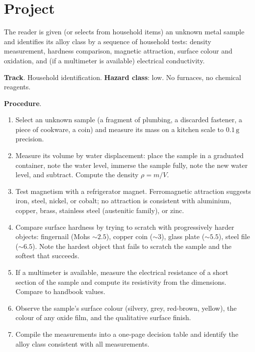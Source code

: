 \section{Project}

\begin{project}
The reader is given (or selects from household items) an unknown
metal sample and identifies its alloy class by a sequence of
household tests: density measurement, hardness comparison, magnetic
attraction, surface colour and oxidation, and (if a multimeter is
available) electrical conductivity.

\textbf{Track}. Household identification.
\textbf{Hazard class}: low. No furnaces, no chemical reagents.

\textbf{Procedure}.

\begin{enumerate}[leftmargin=*]
\item Select an unknown sample (a fragment of plumbing, a discarded
  fastener, a piece of cookware, a coin) and measure its mass on a
  kitchen scale to $0.1\,\text{g}$ precision.
\item Measure its volume by water displacement: place the sample in
  a graduated container, note the water level, immerse the sample
  fully, note the new water level, and subtract. Compute the
  density $\rho = m/V$.
\item Test magnetism with a refrigerator magnet. Ferromagnetic
  attraction suggests iron, steel, nickel, or cobalt; no attraction
  is consistent with aluminium, copper, brass, stainless steel
  (austenitic family), or zinc.
\item Compare surface hardness by trying to scratch with progressively
  harder objects: fingernail (Mohs $\sim 2.5$), copper coin ($\sim
  3$), glass plate ($\sim 5.5$), steel file ($\sim 6.5$). Note the
  hardest object that fails to scratch the sample and the softest
  that succeeds.
\item If a multimeter is available, measure the electrical resistance
  of a short section of the sample and compute its resistivity from
  the dimensions. Compare to handbook values.
\item Observe the sample's surface colour (silvery, grey, red-brown,
  yellow), the colour of any oxide film, and the qualitative
  surface finish.
\item Compile the measurements into a one-page decision table and
  identify the alloy class consistent with all measurements.
\end{enumerate}


\end{project}
